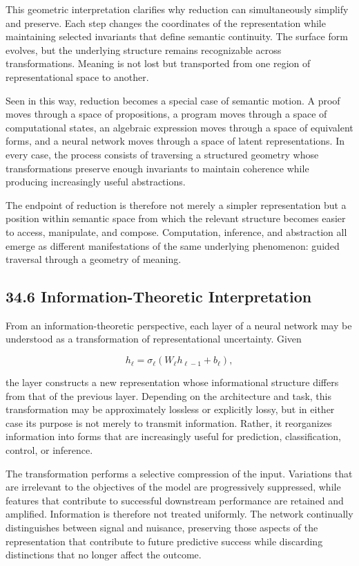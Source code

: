\documentclass[12pt,letterpaper]{article}
\theoremstyle{remark}
\begin{document}
This geometric interpretation clarifies why reduction can simultaneously simplify and preserve. Each step changes the coordinates of the representation while maintaining selected invariants that define semantic continuity. The surface form evolves, but the underlying structure remains recognizable across transformations. Meaning is not lost but transported from one region of representational space to another.

Seen in this way, reduction becomes a special case of semantic motion. A proof moves through a space of propositions, a program moves through a space of computational states, an algebraic expression moves through a space of equivalent forms, and a neural network moves through a space of latent representations. In every case, the process consists of traversing a structured geometry whose transformations preserve enough invariants to maintain coherence while producing increasingly useful abstractions.

The endpoint of reduction is therefore not merely a simpler representation but a position within semantic space from which the relevant structure becomes easier to access, manipulate, and compose. Computation, inference, and abstraction all emerge as different manifestations of the same underlying phenomenon: guided traversal through a geometry of meaning.

\subsection{34.6 Information-Theoretic Interpretation}

From an information-theoretic perspective, each layer of a neural network may be understood as a transformation of representational uncertainty. Given

\[
h_\ell = \sigma_\ell(W_\ell h_{\ell-1} + b_\ell),
\]

the layer constructs a new representation whose informational structure differs from that of the previous layer. Depending on the architecture and task, this transformation may be approximately lossless or explicitly lossy, but in either case its purpose is not merely to transmit information. Rather, it reorganizes information into forms that are increasingly useful for prediction, classification, control, or inference.

The transformation performs a selective compression of the input. Variations that are irrelevant to the objectives of the model are progressively suppressed, while features that contribute to successful downstream performance are retained and amplified. Information is therefore not treated uniformly. The network continually distinguishes between signal and nuisance, preserving those aspects of the representation that contribute to future predictive success while discarding distinctions that no longer affect the outcome.
\end{document}
